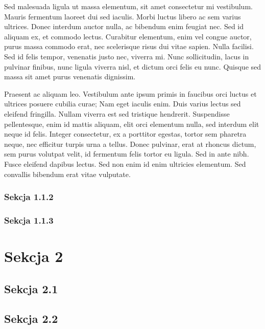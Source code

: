 \documentclass[11pt,a4paper]{article}
\begin{document}
Sed malesuada ligula ut massa elementum, sit amet consectetur mi vestibulum. Mauris fermentum laoreet dui sed iaculis. Morbi luctus libero ac sem varius ultrices. Donec interdum auctor nulla, ac bibendum enim feugiat nec. Sed id aliquam ex, et commodo lectus. Curabitur elementum, enim vel congue auctor, purus massa commodo erat, nec scelerisque risus dui vitae sapien. Nulla facilisi. Sed id felis tempor, venenatis justo nec, viverra mi. Nunc sollicitudin, lacus in pulvinar finibus, nunc ligula viverra nisl, et dictum orci felis eu nunc. Quisque sed massa sit amet purus venenatis dignissim.

Praesent ac aliquam leo. Vestibulum ante ipsum primis in faucibus orci luctus et ultrices posuere cubilia curae; Nam eget iaculis enim. Duis varius lectus sed eleifend fringilla. Nullam viverra est sed tristique hendrerit. Suspendisse pellentesque, enim id mattis aliquam, elit orci elementum nulla, sed interdum elit neque id felis. Integer consectetur, ex a porttitor egestas, tortor sem pharetra neque, nec efficitur turpis urna a tellus. Donec pulvinar, erat at rhoncus dictum, sem purus volutpat velit, id fermentum felis tortor eu ligula. Sed in ante nibh. Fusce eleifend dapibus lectus. Sed non enim id enim ultricies elementum. Sed convallis bibendum erat vitae vulputate.

\newpage


\subsubsection{Sekcja 1.1.2}
\label{subsubsec:Sekcja 1.1.2}

\newpage

\subsubsection{Sekcja 1.1.3}
\label{subsubsec:Sekcja 1.1.3}

\newpage

\section{Sekcja 2}
\label{sec:Sekcja 2}

\subsection{Sekcja 2.1}
\label{subsec:Sekcja 2.1}

\newpage

\subsection{Sekcja 2.2}
\label{subsec:Sekcja 2.2}

\end{document}
